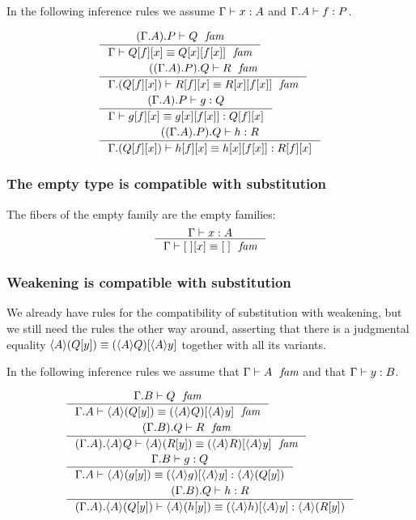 In the following inference rules we assume
$\jterm{\Gamma}{A}{x}$ and $\jterm{\ctxext{\Gamma}{A}}{P}{f}$.

\begin{align}
&\inference{\jfam{\ctxext{{\Gamma}{A}}{P}}{Q}}
{\jfameq{\Gamma}{\subst{x}{{f}{Q}}}{\subst{{x}{f}}{{x}{Q}}}}\\
&\inference{\jfam{\ctxext{{{\Gamma}{A}}{P}}{Q}}{R}}
{\jfameq{\ctxext{\Gamma}{\subst{x}{{f}{Q}}}}{\subst{x}{{f}{R}}}{\subst{{x}{f}}{{x}{R}}}}\\
&\inference{\jterm{\ctxext{{\Gamma}{A}}{P}}{Q}{g}}
{\jtermeq{\Gamma}{\subst{x}{{f}{Q}}}{\subst{x}{{f}{g}}}{\subst{{x}{f}}{{x}{g}}}}\\
&\inference{\jterm{\ctxext{{{\Gamma}{A}}{P}}{Q}}{R}{h}}
{\jtermeq{\ctxext{\Gamma}{\subst{x}{{f}{Q}}}}{\subst{x}{{f}{R}}}{\subst{x}{{f}{h}}}{\subst{{x}{f}}{{x}{h}}}}
\end{align}

\subsubsection{The empty type is compatible with substitution}
The fibers of the empty family are the empty families:
\begin{equation}
\inference{\jterm{\Gamma}{A}{x}}{\jfameq{\Gamma}{\subst{x}{\emptyf}}{\emptyf}}
\end{equation}

\subsubsection{Weakening is compatible with substitution}\label{comp-ws}
We already have rules for the compatibility of substitution with weakening, but
we still need the rules the other way around, asserting that there is a 
judgmental equality $\ctxwk{A}{\subst{y}{Q}}\jdeq\subst{\ctxwk{A}{y}}{\ctxwk{A}{Q}}$
together with all its variants.

In the following inference rules we assume that $\jfam{\Gamma}{A}$ and that
$\jterm{\Gamma}{B}{y}$.

\begin{align}
& \inference{\jfam{\ctxext{\Gamma}{B}}{Q}}{\jfameq{\ctxext{\Gamma}{A}}{\ctxwk{A}{\subst{y}{Q}}}{\subst{\ctxwk{A}{y}}{\ctxwk{A}{Q}}}}\\
& \inference{\jfam{\ctxext{{\Gamma}{B}}{Q}}{R}}{\jfameq{\ctxext{{\Gamma}{A}}{\ctxwk{A}{Q}}}{\ctxwk{A}{\subst{y}{R}}}{\subst{\ctxwk{A}{y}}{\ctxwk{A}{R}}}}\\
& \inference{\jterm{\ctxext{\Gamma}{B}}{Q}{g}}{\jtermeq{\ctxext{\Gamma}{A}}{\ctxwk{A}{\subst{y}{Q}}}{\ctxwk{A}{\subst{y}{g}}}{\subst{\ctxwk{A}{y}}{\ctxwk{A}{g}}}}\\
& \inference{\jterm{\ctxext{{\Gamma}{B}}{Q}}{R}{h}}{\jtermeq{\ctxext{{\Gamma}{A}}{\ctxwk{A}{\subst{y}{Q}}}}{\ctxwk{A}{\subst{y}{R}}}{\ctxwk{A}{\subst{y}{h}}}{\subst{\ctxwk{A}{y}}{\ctxwk{A}{h}}}}
\end{align}

